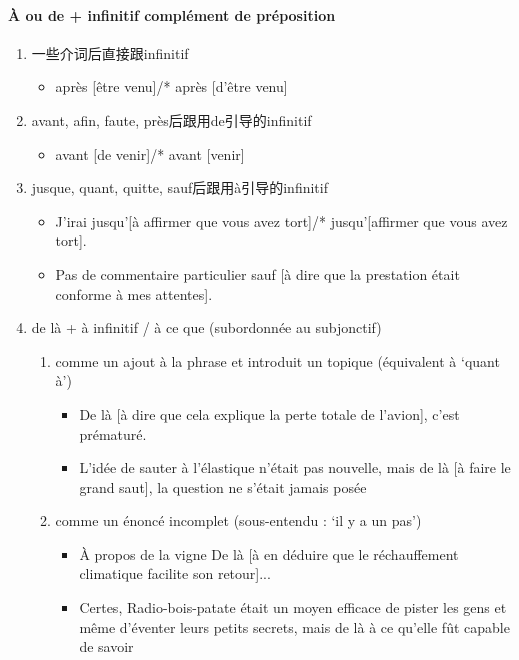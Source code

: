 \documentclass[UTF8]{report}
\begin{document}
\paragraph{À ou de + infinitif complément de préposition}
\begin{enumerate}
    \item 一些介词后直接跟infinitif
    \begin{itemize}
        \item après [être venu]/* après [d’être venu]
    \end{itemize}
    \item avant, afin, faute, près后跟用de引导的infinitif
    \begin{itemize}
        \item  avant [de venir]/* avant [venir]
    \end{itemize}
    \item jusque, quant, quitte, sauf后跟用à引导的infinitif
    \begin{itemize}
        \item J’irai jusqu’[à affirmer que vous avez tort]/* jusqu’[affirmer que vous avez tort].
        \item Pas de commentaire particulier sauf [à dire que la prestation était conforme à mes attentes].
    \end{itemize}
    \item de là + à infinitif / à ce que (subordonnée au subjonctif)
    \begin{enumerate}
        \item comme un ajout à la phrase et introduit un topique (équivalent à ‘quant à’)
        \begin{itemize}
            \item De là [à dire que cela explique la perte totale de l’avion], c’est prématuré.
            \item L’idée de sauter à l’élastique n’était pas nouvelle, mais de là [à faire le grand saut], la question ne s’était jamais posée
        \end{itemize}
        \item comme un énoncé incomplet (sous-entendu : ‘il y a un pas’) 
        \begin{itemize}
            \item À propos de la vigne De là [à en déduire que le réchauffement climatique facilite son retour]...
            \item Certes, Radio-bois-patate était un moyen efficace de pister les gens et même d’éventer leurs petits secrets, mais de là à ce qu’elle fût capable de savoir
        \end{itemize}
    \end{enumerate}
\end{enumerate}
\end{document}
